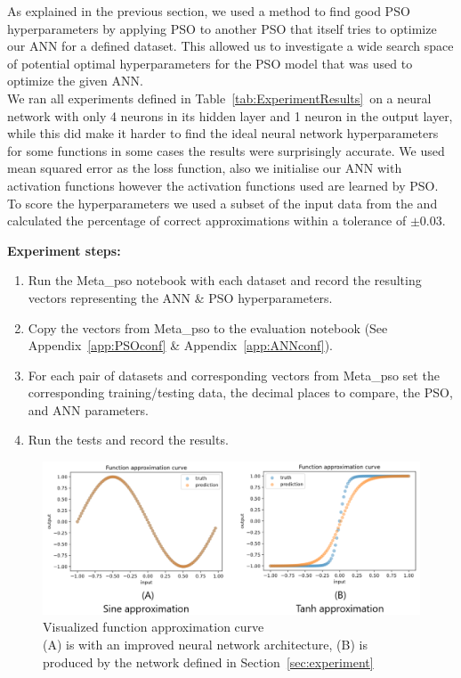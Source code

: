\documentclass[12pt]{article}
\begin{document}
As explained in the previous section, we used a method to find good PSO hyperparameters by applying PSO to another PSO that itself tries to optimize our ANN for a defined dataset.
This allowed us to investigate a wide search space of potential optimal hyperparameters for the PSO model that was used to optimize the given ANN.\\

We ran all experiments defined in Table~\ref{tab:ExperimentResults}~on a neural network with only 4 neurons in its hidden layer and 1 neuron in the output layer, while this did make it harder to find the ideal neural network hyperparameters for some functions in some cases the results were surprisingly accurate.
We used mean squared error as the loss function, also we initialise our ANN with activation functions however the activation functions used are learned by PSO.\\

To score the hyperparameters we used a subset of the input data from the and calculated the percentage of correct approximations within a tolerance of $\pm 0.03$.

\noindent\textbf{Experiment steps:}
\begin{enumerate}
    \item Run the Meta\_pso notebook with each dataset and record the resulting vectors representing the ANN \& PSO hyperparameters.
    \item Copy the vectors from Meta\_pso to the evaluation notebook (See Appendix~\ref{app:PSOconf} \& Appendix~\ref{app:ANNconf}).
    \item For each pair of datasets and corresponding vectors from Meta\_pso set the corresponding training/testing data, the decimal places to compare, the PSO, and ANN parameters.
    \item Run the tests and record the results.
\end{enumerate}

\begin{figure}[H]
    \begin{center}
        \includegraphics[width=1\textwidth]{approximation_curve_plot.png} 
    \end{center}
    \caption{Visualized function approximation curve\\
    (A) is with an improved neural network architecture, (B) is produced by the network defined in Section~\ref{sec:experiment} }
    \label{fig:approximationCurve}   
\end{figure}
\end{document}
